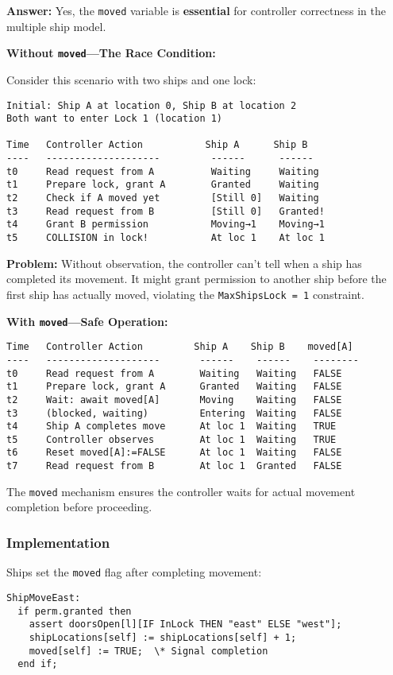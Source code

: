 \documentclass[12pt,a4paper]{article}
\begin{document}
\textbf{Answer:} Yes, the \texttt{moved} variable is \textbf{essential} for controller correctness in the multiple ship model.

\textbf{Without \texttt{moved}---The Race Condition:}

Consider this scenario with two ships and one lock:
\begin{verbatim}
Initial: Ship A at location 0, Ship B at location 2
Both want to enter Lock 1 (location 1)

Time   Controller Action           Ship A      Ship B
----   --------------------         ------      ------
t0     Read request from A          Waiting     Waiting
t1     Prepare lock, grant A        Granted     Waiting
t2     Check if A moved yet         [Still 0]   Waiting
t3     Read request from B          [Still 0]   Granted!
t4     Grant B permission           Moving→1    Moving→1
t5     COLLISION in lock!           At loc 1    At loc 1
\end{verbatim}

\textbf{Problem:} Without observation, the controller can't tell when a ship has completed its movement. It might grant permission to another ship before the first ship has actually moved, violating the \texttt{MaxShipsLock = 1} constraint.

\textbf{With \texttt{moved}---Safe Operation:}

\begin{verbatim}
Time   Controller Action         Ship A    Ship B    moved[A]
----   --------------------       ------    ------    --------
t0     Read request from A        Waiting   Waiting   FALSE
t1     Prepare lock, grant A      Granted   Waiting   FALSE
t2     Wait: await moved[A]       Moving    Waiting   FALSE
t3     (blocked, waiting)         Entering  Waiting   FALSE
t4     Ship A completes move      At loc 1  Waiting   TRUE
t5     Controller observes        At loc 1  Waiting   TRUE
t6     Reset moved[A]:=FALSE      At loc 1  Waiting   FALSE
t7     Read request from B        At loc 1  Granted   FALSE
\end{verbatim}

The \texttt{moved} mechanism ensures the controller waits for actual movement completion before proceeding.

\subsubsection{Implementation}

Ships set the \texttt{moved} flag after completing movement:
\begin{lstlisting}[style=tlaplus]
ShipMoveEast:
  if perm.granted then
    assert doorsOpen[l][IF InLock THEN "east" ELSE "west"];
    shipLocations[self] := shipLocations[self] + 1;
    moved[self] := TRUE;  \* Signal completion
  end if;
\end{lstlisting}
\end{document}
